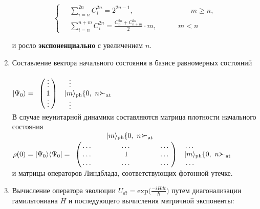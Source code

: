 \begin{enumerate}
{\begin{fleqn}
\begin{equation}
\begin{cases}
		\displaystyle\quad\sum\limits_{i=n}^{2n}C_{i}^{2n} = 2^{2n-1},\qquad\qquad\qquad\qquad m \ge n,\\[18pt]
		\displaystyle\quad\sum\limits_{i=n}^{n+m}C_{i}^{2n} = \frac{C_{n}^{2n} + C_{n+m}^{2n}}{2} \cdot m,\qquad\quad m < n
		\end{cases}
	\end{equation}
	\end{fleqn}
	и росло \textbf{экспоненциально} с увеличением $n$.
	}
\clearpage
\item{Составление вектора начального состояния в базисе равномерных состояний\\
$
	|\Psi_{0}\ra = 
	\bordermatrix{
    	&  \cr
    	& \vdots \cr
    	& 1  \cr
    	& \vdots
	}
	\begin{matrix}
    	\quad\hspace{-5em}\vdots \cr
		\quad|m\rangle_{\mathrm{ph}}\{0,~n\Succ_{\mathrm{at}} \cr
    	\quad\hspace{-5em}\vdots
	\end{matrix}
$
\\[24pt]
В случае неунитарной динамики составляются матрица плотности начального состояния\\
$
	\rho(0) = |\Psi_{0}\ra\la\Psi_{0}| =
	\bordermatrix{
    	& & \quad |m\rangle_{\mathrm{ph}}\{0,~n\Succ_{\mathrm{at}} & \cr
    	& \dots & \dots & \dots \cr
    	& \dots & 1 & \dots \cr
    	& \dots & \dots & \dots
	}
	\begin{matrix}
    	\quad\hspace{-5em}\dots \cr
		\quad|m\rangle_{\mathrm{ph}}\{0,~n\Succ_{\mathrm{at}} \cr
    	\quad\hspace{-5em}\dots
	\end{matrix}
$\\
и матрицы операторов Линдблада, соответствующих фотонной утечке.\\[6pt]
}
\item{\label{ch1:U}
	Вычисление оператора эволюции $\displaystyle U_{dt} = \mathrm{exp}\biggl(\frac{-iHdt}{\hbar}\biggr)$ путем диагонализации гамильтониана $H$ и последующего вычисления матричной экспоненты:

}
\end{enumerate}
